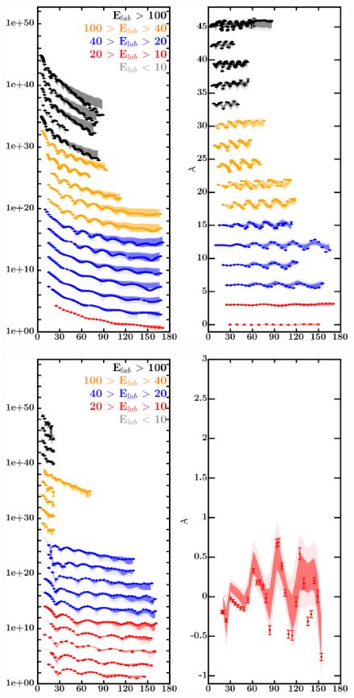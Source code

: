 \documentclass[twocolumn,secnumarabic,amssymb, nobibnotes, aps, prl,
superscriptaddress, nobalancelastpage, draft]{revtex4}
\begin{document}
\begin{figure}[!htb]
    \centering
    \begin{minipage}{0.4\linewidth}
        \centering
        \includegraphics[width=\linewidth]{figures/pb208_protonElastic.png}
        \label{DOM_pb208_proton_elastic}
    \end{minipage}\hspace{6pt}
    \begin{minipage}{0.4\linewidth}
        \centering
        \includegraphics[width=\linewidth]{figures/pb208_neutronElastic.png}

\end{minipage}
\end{figure}
\end{document}
